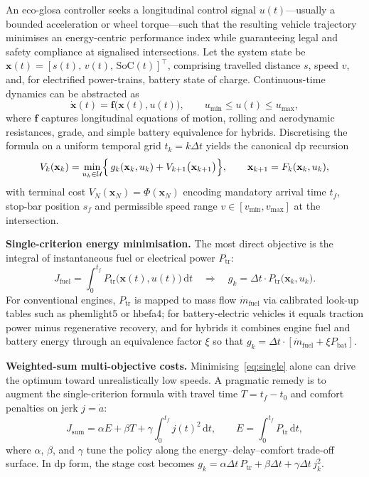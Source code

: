 An \ac{eco-glosa} controller seeks a longitudinal control signal $u(t)$—usually a bounded acceleration or wheel torque—such that the resulting vehicle trajectory minimises an energy-centric performance index while guaranteeing legal and safety compliance at signalised intersections. Let the system state be $\mathbf x(t) = [s(t),\,v(t),\,\mathrm{SoC}(t)]^{\!\top}$, comprising travelled distance $s$, speed $v$, and, for electrified power-trains, battery state of charge. Continuous-time dynamics can be abstracted as
\begin{equation*}
    \dot{\mathbf x}(t) = \mathbf f\bigl(\mathbf x(t), u(t)\bigr),
    \qquad
    u_{\min} \le u(t) \le u_{\max},
\end{equation*}
where $\mathbf f$ captures longitudinal equations of motion, rolling and aerodynamic resistances, grade, and simple battery equivalence for hybrids. Discretising the formula on a uniform temporal grid $t_k = k \Delta t$ yields the canonical \ac{dp} recursion
\begin{equation*}
    V_k(\mathbf x_k) = \min_{u_k \in \mathcal U} \Bigl\{\, g_k(\mathbf x_k, u_k) + V_{k+1}\bigl(\mathbf x_{k+1} \bigr) \Bigr\},
    \qquad
    \mathbf x_{k+1} = F_k(\mathbf x_k, u_k),
\end{equation*}
with terminal cost $V_{N}(\mathbf x_N)=\Phi(\mathbf x_N)$ encoding mandatory arrival time $t_f$, stop-bar position $s_f$ and permissible speed range $v\in[v_{\min},v_{\max}]$ at the intersection.

\textbf{Single-criterion energy minimisation.}
The most direct objective is the integral of instantaneous fuel or electrical power $P_{\text{tr}}$:
\begin{equation*}
\label{eq:single}
J_{\text{fuel}} = \int_{0}^{t_f} P_{\text{tr}}\bigl(\mathbf x(t), u(t)\bigr)\,\mathrm{d}t
\quad\Longrightarrow\quad
g_k = \Delta t \cdot P_{\text{tr}}\bigl(\mathbf x_k, u_k\bigr).
\end{equation*}
For conventional engines, $P_{\text{tr}}$ is mapped to mass flow $\dot m_{\text{fuel}}$ via calibrated look-up tables such as \ac{phem}light5 or \ac{hbefa}4; for battery-electric vehicles it equals traction power minus regenerative recovery, and for hybrids it combines engine fuel and battery energy through an equivalence factor $\xi$ so that $g_k = \Delta t \cdot \left[ \dot m_{\text{fuel}} + \xi P_{\text{bat}} \right]$.

\textbf{Weighted-sum multi-objective costs.}
Minimising~\eqref{eq:single} alone can drive the optimum toward unrealistically low speeds. A pragmatic remedy is to augment the single-criterion formula with travel time $T = t_f - t_0$ and comfort penalties on jerk $j = \dot a$:
\begin{equation*}
    J_{\mathrm{sum}} = \alpha E + \beta T + \gamma \int_{0}^{t_f} j(t)^2\,\mathrm{d}t,
    \qquad
    E = \int_{0}^{t_f} P_{\text{tr}}\,\mathrm{d}t,
\label{eq:weighted}
\end{equation*}
where $\alpha$, $\beta$, and $\gamma$ tune the policy along the energy–delay–comfort trade-off surface. In \ac{dp} form, the stage cost becomes
$g_k = \alpha \Delta t\,P_{\text{tr}} + \beta \Delta t + \gamma \Delta t\,j_k^2$.

